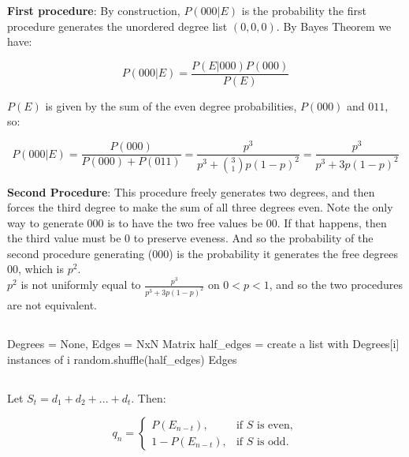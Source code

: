 \documentclass{article}
\begin{document}
 \textbf{First procedure}: By construction, $P(000| E)$ is the probability the first procedure generates the unordered degree list $(0,0,0)$. By Bayes Theorem we have:
 
 $$P(000|E) = \frac{P(E|000)P(000)}{P(E)}$$
 
 $P(E)$ is given by the sum of the even degree probabilities, $P(000)$ and $011$, so:
 
 $$P(000|E) = \frac{P(000)}{P(000) + P(011)} = \frac{p^3}{p^3 + \binom{3}{1}p(1-p)^2} = \frac{p^3}{p^3 + 3p(1-p)^2}$$
 
 \textbf{Second Procedure}: This procedure freely generates two degrees, and then forces the third degree to make the sum of all three degrees even. Note the only way to generate 000 is to have the two free values be 00. If that happens, then the third value must be 0 to preserve eveness. And so the probability of the second procedure generating (000) is the probability it generates the free degrees 00, which is $p^2$. \\
 
 $p^2$ is not uniformly equal to $\frac{p^3}{p^3 + 3p(1-p)^2}$ on $0 < p < 1$, and so the two procedures are not equivalent.

\vspace{-2ex}
\subsection{} 
\vspace{-2ex}
\begin{algorithm}[H]
 Degrees = None, Edges = NxN Matrix\;
half\_edges = create a list with Degrees[i] instances of i\;
random.shuffle(half\_edges)\;
\Return Edges

\end{algorithm}

\subsection{}
\vspace{-2ex}
Let $S_t = d_1 + d_2 + ... + d_t$. Then:

$$q_n  = \begin{cases}
  P(E_{n-t}), & \text{if } S \text{ is even}, \\
  1 - P(E_{n-t}), & \text{if }  S \text{ is odd}.
\end{cases}$$
\end{document}
